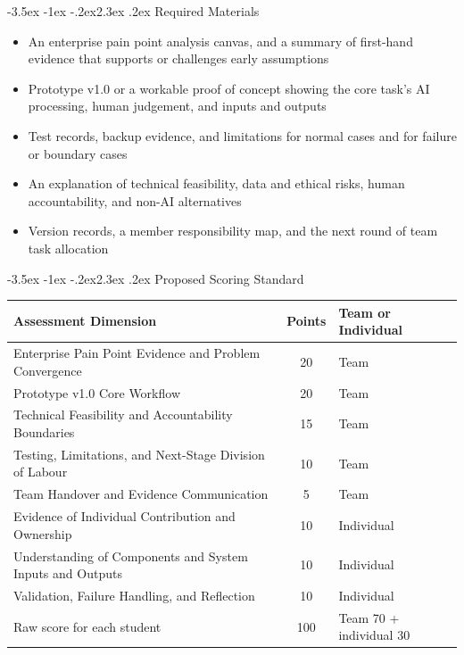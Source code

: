\documentclass[11pt]{article}
\makeatletter
\renewcommand\section{\@startsection{section}{1}{\z@}%
    {-3.5ex \@plus -1ex \@minus -.2ex}{2.3ex \@plus.2ex}%
    {\normalfont\Large\sffamily\bfseries}}
\newcommand{\formaltable}{%
  \small
  \setlength{\tabcolsep}{5pt}%
  \renewcommand{\arraystretch}{1.2}%
  \setlength{\arrayrulewidth}{0.4pt}%
}
\renewcommand{\arraystretch}{1.2}
\makeatother
\begin{document}
\section{Required Materials}
\begin{itemize}
  \item An enterprise pain point analysis canvas, and a summary of first-hand evidence that supports or challenges early assumptions
  \item Prototype v1.0 or a workable proof of concept showing the core task's AI processing, human judgement, and inputs and outputs
  \item Test records, backup evidence, and limitations for normal cases and for failure or boundary cases
  \item An explanation of technical feasibility, data and ethical risks, human accountability, and non-AI alternatives
  \item Version records, a member responsibility map, and the next round of team task allocation
\end{itemize}

\section{Proposed Scoring Standard}
\begin{center}
\formaltable
\begin{tabularx}{\textwidth}{|Y|c|Y|}
\hline
\textbf{Assessment Dimension} & \textbf{Points} & \textbf{Team or Individual} \\ \hline
Enterprise Pain Point Evidence and Problem Convergence & 20 & Team \\ \hline
Prototype v1.0 Core Workflow & 20 & Team \\ \hline
Technical Feasibility and Accountability Boundaries & 15 & Team \\ \hline
Testing, Limitations, and Next-Stage Division of Labour & 10 & Team \\ \hline
Team Handover and Evidence Communication & 5 & Team \\ \hline
Evidence of Individual Contribution and Ownership & 10 & Individual \\ \hline
Understanding of Components and System Inputs and Outputs & 10 & Individual \\ \hline
Validation, Failure Handling, and Reflection & 10 & Individual \\ \hline
Raw score for each student & 100 & Team 70 + individual 30 \\ \hline
\end{tabularx}
\end{center}
\end{document}
